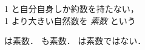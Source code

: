 \begin{definition}
  1 と自分自身しか約数を持たない，\\
  1 より大きい自然数を
  \emph{素数} という
\end{definition}

\begin{example}   
  \begin{itemize}
     は素数．
     も素数．
     は素数ではない．
  \end{itemize}
\end{example}

